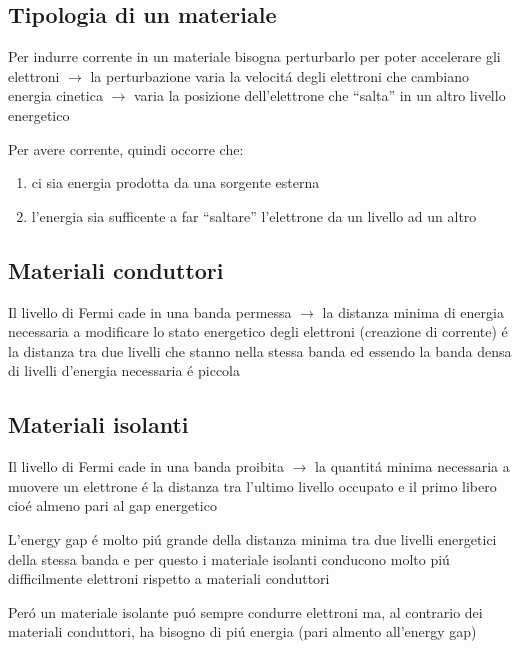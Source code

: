 \documentclass{article}
\begin{document}
\subsection{Tipologia di un materiale}
Per indurre corrente in un materiale bisogna perturbarlo per poter accelerare gli elettroni $\rightarrow$ la perturbazione varia la velocit\'a degli elettroni che cambiano energia cinetica $\rightarrow$ varia la posizione dell'elettrone che ``salta'' in un altro livello energetico

Per avere corrente, quindi occorre che:
\begin{enumerate}
    \item ci sia energia prodotta da una sorgente esterna
    \item l'energia sia sufficente a far ``saltare'' l'elettrone da un livello ad un altro
\end{enumerate}

\subsection{Materiali conduttori}
Il livello di Fermi cade in una banda permessa $\rightarrow$ la distanza minima di energia necessaria a modificare lo stato energetico degli elettroni (creazione di corrente) \'e la distanza tra due livelli che stanno nella stessa banda ed essendo la banda densa di livelli d'energia necessaria \'e piccola

\subsection{Materiali isolanti}
Il livello di Fermi cade in una banda proibita $\rightarrow$ la quantit\'a minima necessaria a muovere un elettrone \'e la distanza tra l'ultimo livello occupato e il primo libero cio\'e almeno pari al gap energetico

L'energy gap \'e molto pi\'u grande della distanza minima tra due livelli energetici della stessa banda e per questo i materiale isolanti conducono molto pi\'u difficilmente elettroni rispetto a materiali conduttori

Per\'o un materiale isolante pu\'o sempre condurre elettroni ma, al contrario dei materiali conduttori, ha bisogno di pi\'u energia (pari almento all'energy gap)
\end{document}
